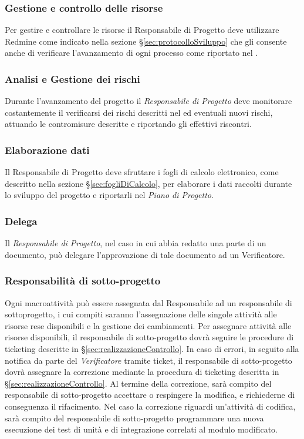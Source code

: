 \subsubsection{Gestione e controllo delle risorse}
Per gestire e controllare le risorse il Responsabile di Progetto deve utilizzare Redmine come indicato nella sezione \S\ref{sec:protocolloSviluppo} che gli consente anche di verificare l’avanzamento di ogni processo come riportato nel \href{run:../../Esterni/\fPianoDiProgetto}{\fEscapePianoDiProgetto} .
\subsubsection{Analisi e Gestione dei rischi}
Durante l’avanzamento del progetto il \emph{Responsabile di Progetto} deve monitorare costantemente il verificarsi dei rischi descritti nel \href{run:../../Esterni/\fPianoDiProgetto}{\fEscapePianoDiProgetto} ed eventuali nuovi rischi, attuando le contromisure descritte e riportando gli effettivi riscontri.

\subsubsection{Elaborazione dati}
Il Responsabile di Progetto deve sfruttare i fogli di calcolo elettronico, come descritto nella sezione \S\ref{sec:fogliDiCalcolo}, per elaborare i dati raccolti durante lo sviluppo del progetto e riportarli nel \emph{Piano di Progetto}.

\subsubsection{Delega}
\label{sec:delega}
Il \emph{Responsabile di Progetto}, nel caso in cui abbia redatto una parte di un documento, può delegare l'approvazione di tale documento ad un Verificatore.
\subsubsection{Responsabilità di sotto-progetto}
Ogni macroattività può essere assegnata dal Responsabile ad un responsabile di sottoprogetto, i cui compiti saranno l’assegnazione delle singole attività alle risorse rese disponibili e la gestione dei cambiamenti.
Per assegnare attività alle risorse disponibili, il responsabile di sotto-progetto dovrà seguire le procedure di ticketing descritte in \S\ref{sec:realizzazioneControllo}.
In caso di errori, in seguito alla notifica da parte del \emph{Verificatore} tramite ticket, il responsabile di sotto-progetto dovrà assegnare la correzione mediante la procedura di ticketing descritta in \S\ref{sec:realizzazioneControllo}. Al termine della correzione, sarà compito del responsabile di sotto-progetto accettare o respingere la modifica, e richiederne di conseguenza il rifacimento.
Nel caso la correzione riguardi un’attività di codifica, sarà compito del responsabile di sotto-progetto programmare una nuova esecuzione dei test di unità e di integrazione correlati al modulo modificato.

